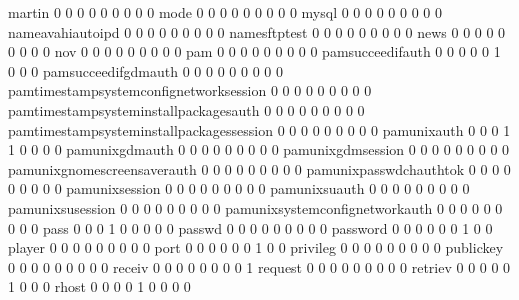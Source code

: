 \documentclass[compress,8pt]{beamer}
\begin{document}
\begin{frame}
\begin{Schunk}
  martin                                     0   0   0   0   0   0   0   0   0
  mode                                       0   0   0   0   0   0   0   0   0
  mysql                                      0   0   0   0   0   0   0   0   0
  nameavahiautoipd                           0   0   0   0   0   0   0   0   0
  namesftptest                               0   0   0   0   0   0   0   0   0
  news                                       0   0   0   0   0   0   0   0   0
  nov                                        0   0   0   0   0   0   0   0   0
  pam                                        0   0   0   0   0   0   0   0   0
  pamsucceedifauth                           0   0   0   0   0   1   0   0   0
  pamsucceedifgdmauth                        0   0   0   0   0   0   0   0   0
  pamtimestampsystemconfignetworksession     0   0   0   0   0   0   0   0   0
  pamtimestampsysteminstallpackagesauth      0   0   0   0   0   0   0   0   0
  pamtimestampsysteminstallpackagessession   0   0   0   0   0   0   0   0   0
  pamunixauth                                0   0   0   1   1   0   0   0   0
  pamunixgdmauth                             0   0   0   0   0   0   0   0   0
  pamunixgdmsession                          0   0   0   0   0   0   0   0   0
  pamunixgnomescreensaverauth                0   0   0   0   0   0   0   0   0
  pamunixpasswdchauthtok                     0   0   0   0   0   0   0   0   0
  pamunixsession                             0   0   0   0   0   0   0   0   0
  pamunixsuauth                              0   0   0   0   0   0   0   0   0
  pamunixsusession                           0   0   0   0   0   0   0   0   0
  pamunixsystemconfignetworkauth             0   0   0   0   0   0   0   0   0
  pass                                       0   0   0   1   0   0   0   0   0
  passwd                                     0   0   0   0   0   0   0   0   0
  password                                   0   0   0   0   0   0   1   0   0
  player                                     0   0   0   0   0   0   0   0   0
  port                                       0   0   0   0   0   0   1   0   0
  privileg                                   0   0   0   0   0   0   0   0   0
  publickey                                  0   0   0   0   0   0   0   0   0
  receiv                                     0   0   0   0   0   0   0   0   1
  request                                    0   0   0   0   0   0   0   0   0
  retriev                                    0   0   0   0   0   1   0   0   0
  rhost                                      0   0   0   0   1   0   0   0   0

\end{Schunk}
\end{frame}
\end{document}
